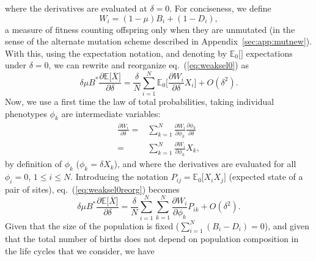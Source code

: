 \documentclass[11pt, letterpaper]{article}
\renewcommand{\eqref}[1]{\textup{{\normalfont eq.~(\ref{#1}}\normalfont)}}
\newcommand{\derivn}[2]{\frac{\partial #1}{\partial #2}}
\newcommand{\Esp}[1]{\mathbb{E}\big[ #1\big]}%
\newcommand{\Espzero}[1]{\mathbb{E}_0\big[ #1\big]}%
\newcommand{\bigO}[1]{O\left( #1 \right)}
\newcommand{\appname}[0]{Appendix}
\newcommand{\selstr}{\delta}
\begin{document}
%
where the derivatives are evaluated at $\selstr = 0$. For conciseness, we define 
%
\begin{equation}\label{eq:app:defW}
W_i = (1-\mu) B_i + (1-D_i), 
\end{equation}
%
a measure of fitness counting offspring only when they are unmutated (in the sense of the alternate mutation scheme described in \appname~\ref{sec:app:mutnew}). With this, using the expectation notation, and denoting by $\Espzero{}$ expectations under $\selstr = 0$, we can rewrite and reorganize \eqref{eq:weaksel0} as
%
\begin{equation}\label{eq:weaksel0reorg}
\selstr \mu B^* \derivn{\Esp{\overline{X}}}{\selstr} = \frac{\selstr}{N} \sum_{i=1}^N \Espzero{ \derivn{W_i}{\selstr} X_i } + \bigO{\selstr^2}.
\end{equation}
%
Now, we use a first time the law of total probabilities, taking individual phenotypes $\phi_k$ are intermediate variables:
%
\begin{align}
\derivn{W_i}{\selstr} =& \sum_{k=1}^N \derivn{W_i}{\phi_k} \derivn{\phi_k}{\selstr} \nonumber \\
=& \sum_{k=1}^N \derivn{W_i}{\phi_k} X_k,
\label{eq:totalproba1}
\end{align}
%
by definition of $\phi_k$ ($\phi_k = \selstr X_k$), and where the derivatives are evaluated for all $\phi_i = 0$, $1\leq i \leq N$. Introducing the notation $P_{ij} = \Espzero{X_i X_j}$ (expected state of a pair of sites), \eqref{eq:weaksel0reorg} becomes
%
\begin{equation}\label{eq:weaksel1}
\selstr \mu B^* \derivn{\Esp{\overline{X}}}{\selstr} = \frac{\selstr}{N} \sum_{i=1}^N \sum_{k=1}^N \derivn{W_i}{\phi_k} P_{ik} + \bigO{\selstr^2}.
\end{equation}
%
Given that the size of the population is fixed ($\sum_{i=1}^N (B_i-D_i)=0$), and given that the total number of births does not depend on population composition in the life cycles that we consider, we have
%
\end{document}
